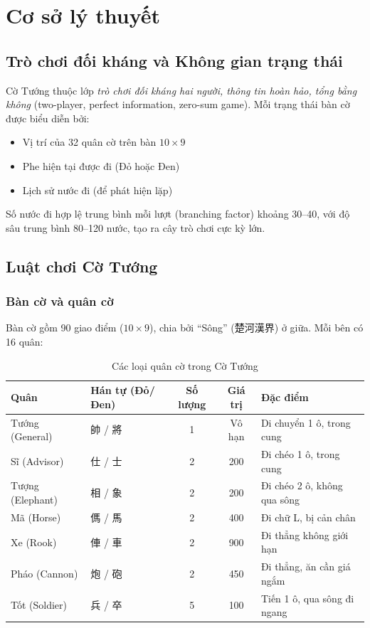 \section{Cơ sở lý thuyết}

\subsection{Trò chơi đối kháng và Không gian trạng thái}
Cờ Tướng thuộc lớp \textit{trò chơi đối kháng hai người, thông tin hoàn hảo, tổng bằng không} (two-player, perfect information, zero-sum game). Mỗi trạng thái bàn cờ được biểu diễn bởi:
\begin{itemize}
    \item Vị trí của 32 quân cờ trên bàn $10 \times 9$
    \item Phe hiện tại được đi (Đỏ hoặc Đen)
    \item Lịch sử nước đi (để phát hiện lặp)
\end{itemize}

Số nước đi hợp lệ trung bình mỗi lượt (branching factor) khoảng 30--40, với độ sâu trung bình 80--120 nước, tạo ra cây trò chơi cực kỳ lớn.

\subsection{Luật chơi Cờ Tướng}

\subsubsection{Bàn cờ và quân cờ}
Bàn cờ gồm 90 giao điểm ($10 \times 9$), chia bởi ``Sông'' (楚河漢界) ở giữa. Mỗi bên có 16 quân:
\begin{table}[H]
\centering
\caption{Các loại quân cờ trong Cờ Tướng}
\begin{tabular}{llccl}
\toprule
\textbf{Quân} & \textbf{Hán tự (Đỏ/Đen)} & \textbf{Số lượng} & \textbf{Giá trị} & \textbf{Đặc điểm} \\
\midrule
Tướng (General) & 帥 / 將 & 1 & Vô hạn & Di chuyển 1 ô, trong cung \\
Sĩ (Advisor) & 仕 / 士 & 2 & 200 & Đi chéo 1 ô, trong cung \\
Tượng (Elephant) & 相 / 象 & 2 & 200 & Đi chéo 2 ô, không qua sông \\
Mã (Horse) & 傌 / 馬 & 2 & 400 & Đi chữ L, bị cản chân \\
Xe (Rook) & 俥 / 車 & 2 & 900 & Đi thẳng không giới hạn \\
Pháo (Cannon) & 炮 / 砲 & 2 & 450 & Đi thẳng, ăn cần giá ngắm \\
Tốt (Soldier) & 兵 / 卒 & 5 & 100 & Tiến 1 ô, qua sông đi ngang \\
\bottomrule
\end{tabular}
\end{table}

